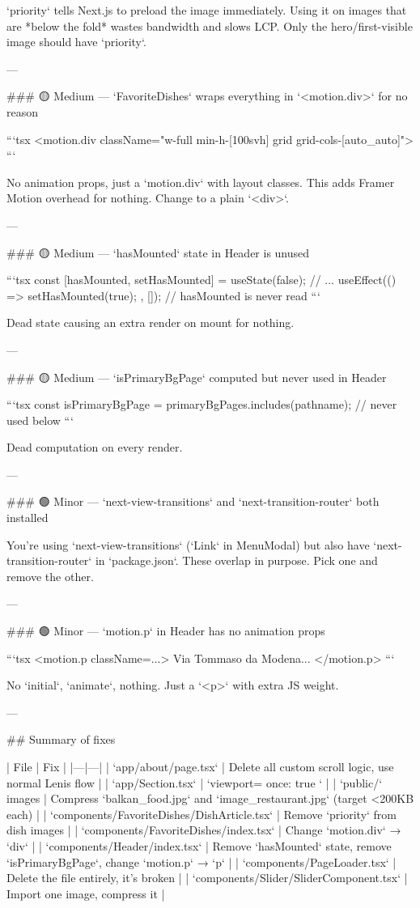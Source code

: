 `priority` tells Next.js to preload the image immediately. Using it on images that are *below the fold* wastes bandwidth and slows LCP. Only the hero/first-visible image should have `priority`.

---

### 🟡 Medium — `FavoriteDishes` wraps everything in `<motion.div>` for no reason

```tsx
<motion.div className="w-full min-h-[100svh] grid grid-cols-[auto_auto]">
```

No animation props, just a `motion.div` with layout classes. This adds Framer Motion overhead for nothing. Change to a plain `<div>`.

---

### 🟡 Medium — `hasMounted` state in Header is unused

```tsx
const [hasMounted, setHasMounted] = useState(false);
// ...
useEffect(() => { setHasMounted(true); }, []);
// hasMounted is never read
```

Dead state causing an extra render on mount for nothing.

---

### 🟡 Medium — `isPrimaryBgPage` computed but never used in Header

```tsx
const isPrimaryBgPage = primaryBgPages.includes(pathname);
// never used below
```

Dead computation on every render.

---

### 🟢 Minor — `next-view-transitions` and `next-transition-router` both installed

You're using `next-view-transitions` (`Link` in MenuModal) but also have `next-transition-router` in `package.json`. These overlap in purpose. Pick one and remove the other.

---

### 🟢 Minor — `motion.p` in Header has no animation props

```tsx
<motion.p className={...}>
  Via Tommaso da Modena...
</motion.p>
```

No `initial`, `animate`, nothing. Just a `<p>` with extra JS weight.

---

## Summary of fixes

| File | Fix |
|---|---|
| `app/about/page.tsx` | Delete all custom scroll logic, use normal Lenis flow |
| `app/Section.tsx` | `viewport={{ once: true }}` |
| `public/` images | Compress `balkan_food.jpg` and `image_restaurant.jpg` (target <200KB each) |
| `components/FavoriteDishes/DishArticle.tsx` | Remove `priority` from dish images |
| `components/FavoriteDishes/index.tsx` | Change `motion.div` → `div` |
| `components/Header/index.tsx` | Remove `hasMounted` state, remove `isPrimaryBgPage`, change `motion.p` → `p` |
| `components/PageLoader.tsx` | Delete the file entirely, it's broken |
| `components/Slider/SliderComponent.tsx` | Import one image, compress it |

